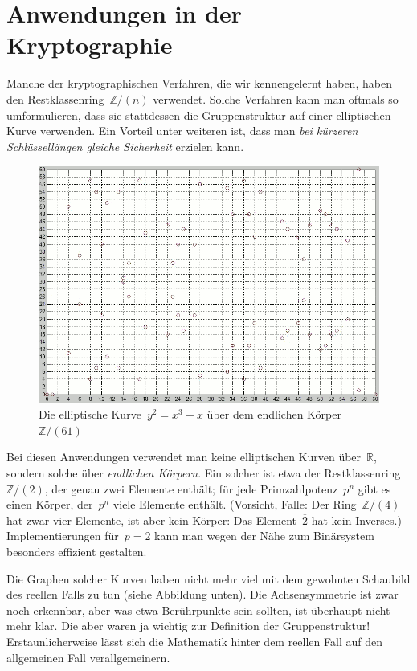 \documentclass{zirkelblatt}
\newcommand{\head}[1]{\section*{\rmfamily #1}}%
\newcommand{\ol}[1]{\ensuremath{\overline{#1}}}
\newcommand{\ZZ}{\mathbb{Z}}
\newcommand{\RR}{\mathbb{R}}
\begin{document}
\head{Anwendungen in der Kryptographie}

Manche der kryptographischen Verfahren, die wir kennengelernt haben, haben den
Restklassenring~$\ZZ/(n)$ verwendet. Solche Verfahren kann man oftmals so
umformulieren, dass sie stattdessen die Gruppenstruktur auf einer elliptischen
Kurve verwenden. Ein Vorteil unter weiteren ist, dass man \emph{bei kürzeren
Schlüssellängen gleiche Sicherheit} erzielen kann.

\begin{figure}[b!]
  \centering
  \includegraphics[scale=0.4]{elliptic-curve-z61}
  \caption{Die elliptische Kurve~$y^2 = x^3 - x$ über dem endlichen
  Körper~$\ZZ/(61)$}
\end{figure}

Bei diesen Anwendungen verwendet man keine elliptischen Kurven über~$\RR$,
sondern solche über \emph{endlichen Körpern}. Ein solcher ist etwa der
Restklassenring~$\ZZ/(2)$, der genau zwei Elemente enthält; für jede
Primzahlpotenz~$p^n$ gibt es einen Körper, der~$p^n$ viele
Elemente enthält. (Vorsicht, Falle: Der Ring~$\ZZ/(4)$ hat zwar vier
Elemente, ist aber kein Körper: Das Element~$\ol{2}$ hat kein Inverses.)
Implementierungen für~$p = 2$ kann man wegen der Nähe zum Binärsystem besonders
effizient gestalten.

Die Graphen solcher Kurven haben nicht mehr viel mit dem
gewohnten Schaubild des reellen Falls zu tun (siehe Abbildung unten). Die
Achsensymmetrie ist zwar noch erkennbar, aber was etwa Berührpunkte sein
sollten, ist überhaupt nicht mehr klar. Die aber waren ja wichtig zur
Definition der Gruppenstruktur! Erstaunlicherweise lässt sich die Mathematik
hinter dem reellen Fall auf den allgemeinen Fall verallgemeinern.
\end{document}
